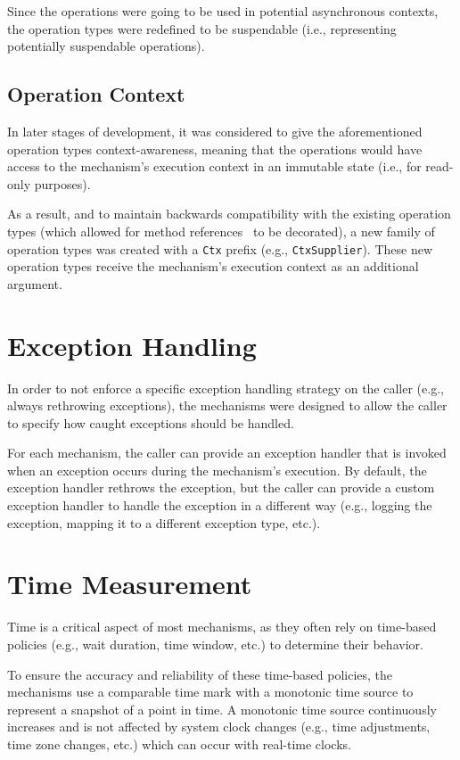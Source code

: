 Since the operations were going to be used in potential asynchronous contexts,
the operation types were redefined to be suspendable (i.e., representing potentially suspendable operations).

\subsection{Operation Context}\label{subsec:operation-context}

In later stages of development, it was considered to give the aforementioned operation types context-awareness,
meaning that the operations would have access to the mechanism's execution context in an immutable state
(i.e., for read-only purposes).

As a result, and to maintain backwards compatibility with the existing operation types (which allowed for method references~\cite{java-method-references} to be decorated), a new family of operation types was created with a \texttt{Ctx} prefix (e.g., \texttt{CtxSupplier}).
These new operation types receive the mechanism's execution context as an additional argument.


\section{Exception Handling}\label{sec:exception-handling}

In order to not enforce a specific exception handling strategy on the caller (e.g., always rethrowing exceptions),
the mechanisms were designed to allow the caller to specify how caught exceptions should be handled.

For each mechanism,
the caller can provide an exception handler that is invoked when an exception occurs during the mechanism's execution.
By default, the exception handler rethrows the exception,
but the caller can provide a custom exception handler to handle the exception in a different way
(e.g., logging the exception, mapping it to a different exception type, etc.).


\section{Time Measurement}\label{sec:time-measurement}

Time is a critical aspect of most mechanisms, as they often rely on time-based policies (e.g., wait duration, time window, etc.) to determine their behavior.

To ensure the accuracy and reliability of these time-based policies,
the mechanisms use a comparable time mark with a monotonic time source to represent a snapshot of a point in time.
A monotonic time source continuously increases and is not affected by system clock changes (e.g., time adjustments, time zone changes, etc.) which can occur with real-time clocks.

